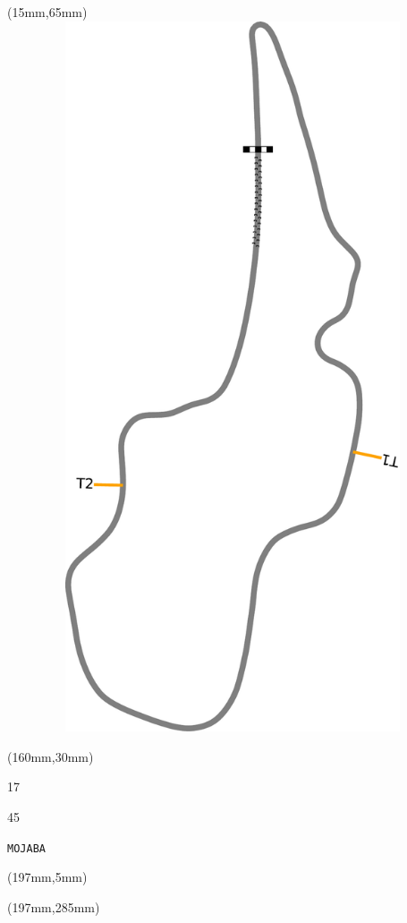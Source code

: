 \begin{textblock*}{185mm}(15mm,65mm)%
\centering
\mbox{\includegraphics[width=185mm,height=210mm,keepaspectratio]{PT/MOJABA.pdf}}
\end{textblock*}
\begin{textblock*}{40mm}(160mm,30mm)%
\Large
\par{} 
\par17 
\par45 
\par\hfill\tiny\tt MOJABA\\
\end{textblock*}
\begin{textblock*}{20mm}(197mm,5mm)%
\fbox{\thepage}
\label{MOJABA}
\end{textblock*}
\begin{textblock*}{20mm}(197mm,285mm)%
\fbox{\thepage}
\end{textblock*}


